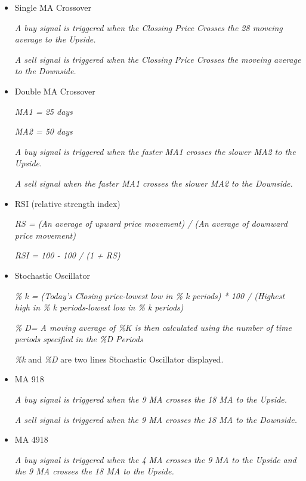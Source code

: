 \documentclass{article}
\begin{document}
\begin{itemize}

\item Single MA Crossover

\emph{A buy signal is triggered when the Clossing Price Crosses the 28 moveing average to the Upside.}

\emph{A sell signal is triggered when the Clossing Price Crosses the moveing average to the Downside.}
\cite{genetic-algorithms-for-predicting-the-egyptian-stock-market}

\item Double MA Crossover

\emph{MA1 = 25 days}

\emph{MA2 = 50 days}

\emph{A buy signal is triggered when the faster MA1 crosses the slower MA2 to the Upside.}

\emph{A sell signal when the faster MA1 crosses the slower MA2 to the Downside.}
\cite{genetic-algorithms-for-predicting-the-egyptian-stock-market}

\item RSI (relative strength index)

\emph{RS = (An average of upward price movement) / (An average of downward price movement)}

\emph{RSI = 100 - 100 / (1 + RS)} 
\cite{stock-market-prediction-model-using-TPWS}

\item Stochastic Oscillator

\emph{\% k = (Today’s Closing price-lowest low in \% k periods) * 100 / (Highest high in \% k periods-lowest low in \% k periods)}

\emph{\% D= A moving average of \%K is then calculated using the number of time periods specified in the \%D Periods}

\emph{\%k} and \emph{\%D} are two lines Stochastic Oscillator displayed. 
\cite{stock-market-prediction-model-using-TPWS}

\item MA 918

\emph{A buy signal is triggered when the 9 MA crosses the 18 MA to the Upside.}

\emph{A sell signal is triggered when the 9 MA crosses the 18 MA to the Downside.}
\cite{stock-market-prediction-model-using-TPWS}

\item MA 4918

\emph{A buy signal is triggered when the 4 MA crosses the 9 MA to the Upside and the 9 MA crosses the 18 MA to the Upside.}


\end{itemize}
\end{document}

